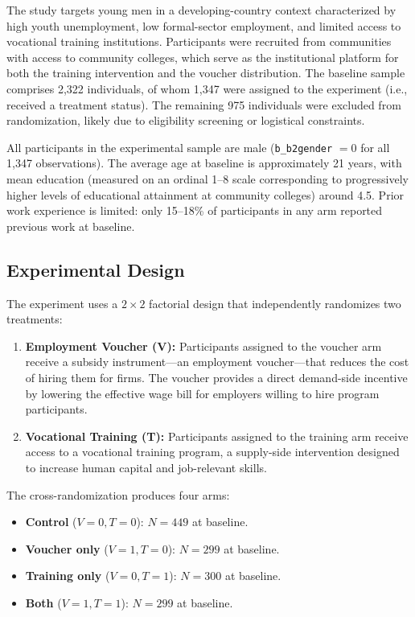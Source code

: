 \documentclass[12pt]{article}
\begin{document}
The study targets young men in a developing-country context characterized by high youth unemployment, low formal-sector employment, and limited access to vocational training institutions. Participants were recruited from communities with access to community colleges, which serve as the institutional platform for both the training intervention and the voucher distribution. The baseline sample comprises 2,322 individuals, of whom 1,347 were assigned to the experiment (i.e., received a treatment status). The remaining 975 individuals were excluded from randomization, likely due to eligibility screening or logistical constraints.

All participants in the experimental sample are male (\texttt{b\_b2gender} $= 0$ for all 1,347 observations). The average age at baseline is approximately 21 years, with mean education (measured on an ordinal 1--8 scale corresponding to progressively higher levels of educational attainment at community colleges) around 4.5. Prior work experience is limited: only 15--18\% of participants in any arm reported previous work at baseline.

\subsection{Experimental Design}

The experiment uses a $2 \times 2$ factorial design that independently randomizes two treatments:

\begin{enumerate}[leftmargin=2cm]
    \item \textbf{Employment Voucher (V):} Participants assigned to the voucher arm receive a subsidy instrument---an employment voucher---that reduces the cost of hiring them for firms. The voucher provides a direct demand-side incentive by lowering the effective wage bill for employers willing to hire program participants.
    \item \textbf{Vocational Training (T):} Participants assigned to the training arm receive access to a vocational training program, a supply-side intervention designed to increase human capital and job-relevant skills.
\end{enumerate}

The cross-randomization produces four arms:
\begin{itemize}[leftmargin=2cm]
    \item \textbf{Control} ($V=0, T=0$): $N = 449$ at baseline.
    \item \textbf{Voucher only} ($V=1, T=0$): $N = 299$ at baseline.
    \item \textbf{Training only} ($V=0, T=1$): $N = 300$ at baseline.
    \item \textbf{Both} ($V=1, T=1$): $N = 299$ at baseline.
\end{itemize}
\end{document}
